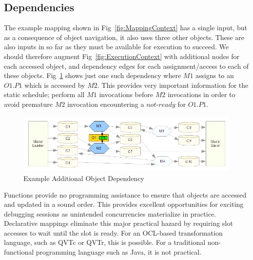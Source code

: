 \documentclass{llncs}
\begin{document}
\subsection{Dependencies}

The example mapping shown in Fig~\ref{fig:MappingContext} has a single input, but as a consequence of object navigation, it also uses three other objects. These are also inputs in so far as they must be available for execution to succeed. We should therefore augment Fig~\ref{fig:ExecutionContext} with additional nodes for each accessed object, and dependency edges for each assignment/access to each of these objects. Fig~\ref{fig:ObjectContext} shows just one such dependency where $M1$ assigns to an $O1.P1$ which is accessed by $M2$. This provides very important information for the static schedule; perform all $M1$ invocations before $M2$ invocations in order to avoid premature $M2$ invocation encountering a $not$-$ready$ for $O1.P1$.


\begin{figure}
  \begin{center}
    \includegraphics[width=4.75in]{ObjectContext.png}
  \end{center}
  \caption{Example Additional Object Dependency}
  \label{fig:ObjectContext}
\end{figure}

Functions provide no programming assistance to ensure that objects are accessed and updated in a sound order. This provides excellent opportunities for exciting debugging sessions as unintended concurrencies materialize in practice. Declarative mappings eliminate this major practical hazard by requiring slot accesses to wait until the slot is ready. For an OCL-based transformation language, such as QVTc or QVTr, this is possible. For a traditional non-functional programming language such as Java, it is not practical.

\end{document}
